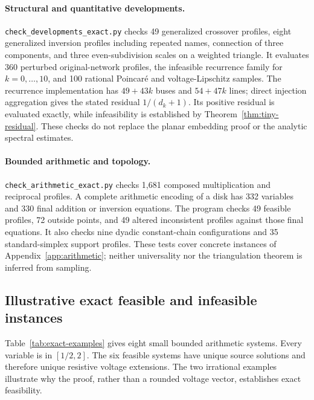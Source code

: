 \paragraph{Structural and quantitative developments.}
\texttt{check\_developments\_exact.py} checks 49 generalized crossover
profiles, eight generalized inversion profiles including repeated names,
connection of three components, and three even-subdivision scales on a
weighted triangle. It evaluates 360 perturbed original-network profiles,
the infeasible recurrence family for $k=0,\ldots,10$, and 100 rational
Poincar\'e and voltage-Lipschitz samples. The recurrence implementation has
$49+43k$ buses and $54+47k$ lines; direct injection aggregation gives the
stated residual $1/(d_k+1)$. Its positive residual is evaluated exactly,
while infeasibility is established by Theorem~\ref{thm:tiny-residual}.
These checks do not replace the planar embedding proof or the analytic
spectral estimates.

\paragraph{Bounded arithmetic and topology.}
\texttt{check\_arithmetic\_exact.py} checks 1,681 composed multiplication
and reciprocal profiles. A complete arithmetic encoding of a disk has 332
variables and 330 final addition or inversion equations. The program checks
49 feasible profiles, 72 outside points, and 49 altered inconsistent profiles
against those final equations. It also checks nine dyadic constant-chain
configurations and 35 standard-simplex support profiles. These tests cover
concrete instances of Appendix~\ref{app:arithmetic}; neither universality nor
the triangulation theorem is inferred from sampling.

\subsection{Illustrative exact feasible and infeasible instances}

Table~\ref{tab:exact-examples} gives eight small bounded arithmetic systems.
Every variable is in $[1/2,2]$.
The six feasible systems have unique source solutions and therefore unique
resistive voltage extensions. The two irrational examples illustrate why
the proof, rather than a rounded voltage vector, establishes exact feasibility.

